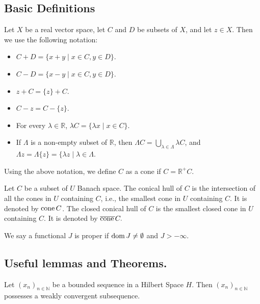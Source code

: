 


\subsection{Basic Definitions}


Let $X$ be a real  vector space, let $C$ and $D$ be subsets of $X$, and let $z \in X$. Then we use the following notation:
\begin{itemize}
	\item $C + D =\lbrace x + y \mid x \in C, y \in D\rbrace$.
	\item $C -D =\lbrace x - y \mid x \in C, y \in D\rbrace$.
	\item $z+C=\lbrace z \rbrace +C$.
	\item  $C-z=C-\lbrace z \rbrace$. 
	\item For every $\lambda \in \mathbb{R}$, $\lambda C =\lbrace\lambda x \mid x \in C\rbrace$.
	\item  If $\Lambda$ is a non-empty subset of $\mathbb{R}$, then $\Lambda C = \bigcup_{\lambda \in \Lambda}\lambda C$, and $\Lambda z = \Lambda \lbrace z \rbrace =\lbrace\lambda z \mid \lambda \in \Lambda$.
\end{itemize}
 

\begin{definition}[Cone]
	Using the above notation, we define $C$ as a cone if $C=\mathbb{R}^+C$.
\end{definition}

\begin{definition}
	Let $C$ be a subset of $U$ Banach space. The conical hull of $C$ is the intersection of all the cones in $U$ containing $C$, i.e., the smallest cone in $U$ containing $C$. It is denoted by $\mathrm{cone\,} C$. The closed conical hull of $C$ is the smallest closed cone in $U$ containing $C$. It is denoted by $\overline{\mathrm{cone\,}} C.$
\end{definition}

\begin{definition}
	We say a functional $J$ is proper if $\mathrm{dom\,} J \neq \emptyset$ and $J>-\infty$.
\end{definition}
\subsection{Useful lemmas and Theorems.}
\begin{lemma}
	\label{lemma0. Bounded and weakly convergent}
	Let $(x_n)_{n \in \mathbb{N}}$ be a bounded sequence in a Hilbert Space $H$. Then $(x_n)_{n \in \mathbb{N}}$ possesses a weakly convergent subsequence.
\end{lemma}

